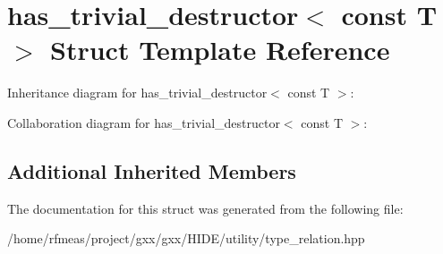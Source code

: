 \hypertarget{structhas__trivial__destructor_3_01const_01T_01_4}{}\section{has\+\_\+trivial\+\_\+destructor$<$ const T $>$ Struct Template Reference}
\label{structhas__trivial__destructor_3_01const_01T_01_4}


Inheritance diagram for has\+\_\+trivial\+\_\+destructor$<$ const T $>$\+:


Collaboration diagram for has\+\_\+trivial\+\_\+destructor$<$ const T $>$\+:
\subsection*{Additional Inherited Members}


The documentation for this struct was generated from the following file\+:\begin{DoxyCompactItemize}
\item 
/home/rfmeas/project/gxx/gxx/\+H\+I\+D\+E/utility/type\+\_\+relation.\+hpp\end{DoxyCompactItemize}
